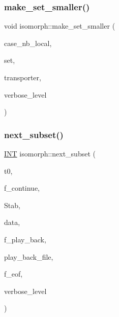 \subsubsection{\texorpdfstring{make\+\_\+set\+\_\+smaller()}{make\_set\_smaller()}}
{\footnotesize\ttfamily void isomorph\+::make\+\_\+set\+\_\+smaller (\begin{DoxyParamCaption}\item[{\mbox{\hyperlink{galois_8h_a09fddde158a3a20bd2dcadb609de11dc}{I\+NT}}}]{case\+\_\+nb\+\_\+local,  }\item[{\mbox{\hyperlink{galois_8h_a09fddde158a3a20bd2dcadb609de11dc}{I\+NT}} $\ast$}]{set,  }\item[{\mbox{\hyperlink{galois_8h_a09fddde158a3a20bd2dcadb609de11dc}{I\+NT}} $\ast$}]{transporter,  }\item[{\mbox{\hyperlink{galois_8h_a09fddde158a3a20bd2dcadb609de11dc}{I\+NT}}}]{verbose\+\_\+level }\end{DoxyParamCaption})}

\mbox{\label{classisomorph_a9e5876d214f75b10f9b301115ed80002}} 
\subsubsection{\texorpdfstring{next\+\_\+subset()}{next\_subset()}}
{\footnotesize\ttfamily \mbox{\hyperlink{galois_8h_a09fddde158a3a20bd2dcadb609de11dc}{I\+NT}} isomorph\+::next\+\_\+subset (\begin{DoxyParamCaption}\item[{\mbox{\hyperlink{galois_8h_a09fddde158a3a20bd2dcadb609de11dc}{I\+NT}}}]{t0,  }\item[{\mbox{\hyperlink{galois_8h_a09fddde158a3a20bd2dcadb609de11dc}{I\+NT}} \&}]{f\+\_\+continue,  }\item[{\mbox{\hyperlink{classsims}{sims}} $\ast$}]{Stab,  }\item[{\mbox{\hyperlink{galois_8h_a09fddde158a3a20bd2dcadb609de11dc}{I\+NT}} $\ast$}]{data,  }\item[{\mbox{\hyperlink{galois_8h_a09fddde158a3a20bd2dcadb609de11dc}{I\+NT}}}]{f\+\_\+play\+\_\+back,  }\item[{ifstream $\ast$}]{play\+\_\+back\+\_\+file,  }\item[{\mbox{\hyperlink{galois_8h_a09fddde158a3a20bd2dcadb609de11dc}{I\+NT}} \&}]{f\+\_\+eof,  }\item[{\mbox{\hyperlink{galois_8h_a09fddde158a3a20bd2dcadb609de11dc}{I\+NT}}}]{verbose\+\_\+level }\end{DoxyParamCaption})}

